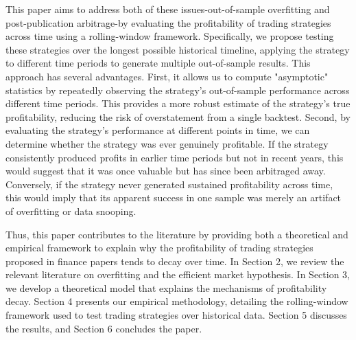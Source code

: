 This paper aims to address both of these issues-out-of-sample overfitting and post-publication arbitrage-by evaluating the profitability of trading strategies across time using a rolling-window framework. Specifically, we propose testing these strategies over the longest possible historical timeline, applying the strategy to different time periods to generate multiple out-of-sample results. This approach has several advantages. First, it allows us to compute "asymptotic" statistics by repeatedly observing the strategy's out-of-sample performance across different time periods. This provides a more robust estimate of the strategy's true profitability, reducing the risk of overstatement from a single backtest. Second, by evaluating the strategy's performance at different points in time, we can determine whether the strategy was ever genuinely profitable. If the strategy consistently produced profits in earlier time periods but not in recent years, this would suggest that it was once valuable but has since been arbitraged away. Conversely, if the strategy never generated sustained profitability across time, this would imply that its apparent success in one sample was merely an artifact of overfitting or data snooping.

Thus, this paper contributes to the literature by providing both a theoretical and empirical framework to explain why the profitability of trading strategies proposed in finance papers tends to decay over time. In Section 2, we review the relevant literature on overfitting and the efficient market hypothesis. In Section 3, we develop a theoretical model that explains the mechanisms of profitability decay. Section 4 presents our empirical methodology, detailing the rolling-window framework used to test trading strategies over historical data. Section 5 discusses the results, and Section 6 concludes the paper.

